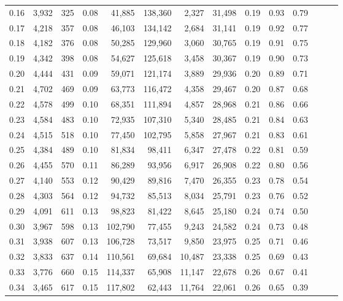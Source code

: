 \begin{tabular}{rrrrrrrrrrrrrr}
0.16 &  3,932 &  325 &  0.08 &   41,885 &  138,360 &   2,327 &  31,498 &  0.19 &  0.93 &      0.79 \\
0.17 &  4,218 &  357 &  0.08 &   46,103 &  134,142 &   2,684 &  31,141 &  0.19 &  0.92 &      0.77 \\
0.18 &  4,182 &  376 &  0.08 &   50,285 &  129,960 &   3,060 &  30,765 &  0.19 &  0.91 &      0.75 \\
0.19 &  4,342 &  398 &  0.08 &   54,627 &  125,618 &   3,458 &  30,367 &  0.19 &  0.90 &      0.73 \\
0.20 &  4,444 &  431 &  0.09 &   59,071 &  121,174 &   3,889 &  29,936 &  0.20 &  0.89 &      0.71 \\
0.21 &  4,702 &  469 &  0.09 &   63,773 &  116,472 &   4,358 &  29,467 &  0.20 &  0.87 &      0.68 \\
0.22 &  4,578 &  499 &  0.10 &   68,351 &  111,894 &   4,857 &  28,968 &  0.21 &  0.86 &      0.66 \\
0.23 &  4,584 &  483 &  0.10 &   72,935 &  107,310 &   5,340 &  28,485 &  0.21 &  0.84 &      0.63 \\
0.24 &  4,515 &  518 &  0.10 &   77,450 &  102,795 &   5,858 &  27,967 &  0.21 &  0.83 &      0.61 \\
0.25 &  4,384 &  489 &  0.10 &   81,834 &   98,411 &   6,347 &  27,478 &  0.22 &  0.81 &      0.59 \\
0.26 &  4,455 &  570 &  0.11 &   86,289 &   93,956 &   6,917 &  26,908 &  0.22 &  0.80 &      0.56 \\
0.27 &  4,140 &  553 &  0.12 &   90,429 &   89,816 &   7,470 &  26,355 &  0.23 &  0.78 &      0.54 \\
0.28 &  4,303 &  564 &  0.12 &   94,732 &   85,513 &   8,034 &  25,791 &  0.23 &  0.76 &      0.52 \\
0.29 &  4,091 &  611 &  0.13 &   98,823 &   81,422 &   8,645 &  25,180 &  0.24 &  0.74 &      0.50 \\
0.30 &  3,967 &  598 &  0.13 &  102,790 &   77,455 &   9,243 &  24,582 &  0.24 &  0.73 &      0.48 \\
0.31 &  3,938 &  607 &  0.13 &  106,728 &   73,517 &   9,850 &  23,975 &  0.25 &  0.71 &      0.46 \\
0.32 &  3,833 &  637 &  0.14 &  110,561 &   69,684 &  10,487 &  23,338 &  0.25 &  0.69 &      0.43 \\
0.33 &  3,776 &  660 &  0.15 &  114,337 &   65,908 &  11,147 &  22,678 &  0.26 &  0.67 &      0.41 \\
0.34 &  3,465 &  617 &  0.15 &  117,802 &   62,443 &  11,764 &  22,061 &  0.26 &  0.65 &      0.39 \\

\end{tabular}
